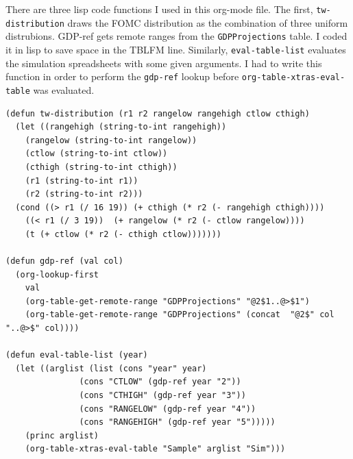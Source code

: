 \documentclass[11pt]{article}
\begin{document}
There are three lisp code functions I used in this org-mode file. The first, \texttt{tw-distribution} draws the FOMC distribution as the combination of three uniform distrubions. GDP-ref gets remote ranges from the \texttt{GDPProjections} table. I coded it in lisp to save space in the TBLFM line. Similarly, \texttt{eval-table-list} evaluates the simulation spreadsheets with some given arguments. I had to write this function in order to perform the \texttt{gdp-ref} lookup before \texttt{org-table-xtras-eval-table} was evaluated.

\begin{verbatim}
(defun tw-distribution (r1 r2 rangelow rangehigh ctlow cthigh)
  (let ((rangehigh (string-to-int rangehigh))
	(rangelow (string-to-int rangelow))
	(ctlow (string-to-int ctlow))
	(cthigh (string-to-int cthigh))
	(r1 (string-to-int r1))
	(r2 (string-to-int r2)))
  (cond ((> r1 (/ 16 19)) (+ cthigh (* r2 (- rangehigh cthigh))))
	((< r1 (/ 3 19))  (+ rangelow (* r2 (- ctlow rangelow))))
	(t (+ ctlow (* r2 (- cthigh ctlow)))))))

(defun gdp-ref (val col)
  (org-lookup-first 
    val
    (org-table-get-remote-range "GDPProjections" "@2$1..@>$1")
    (org-table-get-remote-range "GDPProjections" (concat  "@2$" col "..@>$" col))))

(defun eval-table-list (year)
  (let ((arglist (list (cons "year" year)
		       (cons "CTLOW" (gdp-ref year "2"))
		       (cons "CTHIGH" (gdp-ref year "3"))
		       (cons "RANGELOW" (gdp-ref year "4"))
		       (cons "RANGEHIGH" (gdp-ref year "5")))))
    (princ arglist)
    (org-table-xtras-eval-table "Sample" arglist "Sim")))
\end{verbatim}
\end{document}
